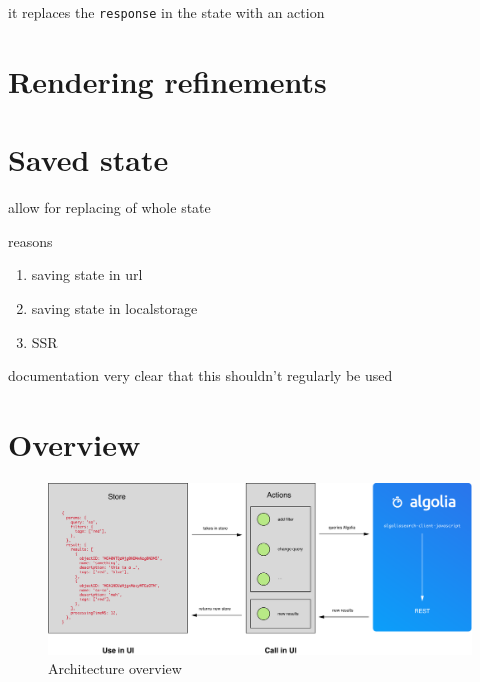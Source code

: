 it replaces the {\tt response} in the state with an action


\section{Rendering refinements} %
\label{sec:rendering_refinements}



\section{Saved state} %
\label{sec:saved_state}

allow for replacing of whole state

reasons

\begin{enumerate}
  \item saving state in url
  \item saving state in localstorage
  \item SSR
\end{enumerate}

documentation very clear that this shouldn't regularly be used


\section{Overview} %
\label{sec:overview}

\begin{figure}[H]
  \label{figure:company-logo}
  \centering
  \includegraphics[width=\textwidth]{../assets/architecture.pdf}
  \caption{Architecture overview\cite{blog-architecture}}
\end{figure}


